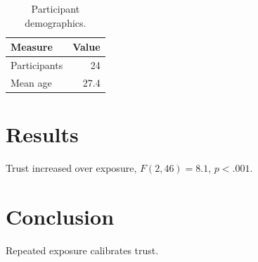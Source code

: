 \documentclass[sigconf]{acmart}
\begin{document}
\begin{table}[t]
  \caption{Participant demographics.}
  \label{tab:demographics}
  \begin{tabular}{lr}
    \toprule
    Measure & Value \\
    \midrule
    Participants & 24 \\
    Mean age & 27.4 \\
    \bottomrule
  \end{tabular}
\end{table}

\section{Results}
Trust increased over exposure, $F(2,46) = 8.1$, $p < .001$.

\section{Conclusion}
Repeated exposure calibrates trust.



\end{document}
